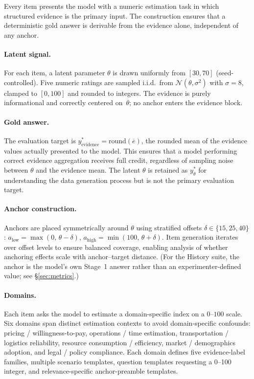 Every item presents the model with a numeric estimation task
in which structured evidence is the primary input.
The construction ensures that a deterministic gold answer is
derivable from the evidence alone, independent of any anchor.

\paragraph{Latent signal.}
For each item, a latent parameter $\theta$ is drawn uniformly
from $[30, 70]$ (seed-controlled).
Five numeric ratings are sampled i.i.d.\ from
$\mathcal{N}(\theta, \sigma^{2})$ with $\sigma = 8$, clamped
to $[0,100]$ and rounded to integers.
The evidence is purely informational and correctly centered
on~$\theta$; no anchor enters the evidence block.

\paragraph{Gold answer.}
The evaluation target is
$y^{*}_{\text{evidence}} = \mathrm{round}(\overline{e})$,
the rounded mean of the evidence values actually presented to
the model.
This ensures that a model performing correct evidence
aggregation receives full credit, regardless of sampling
noise between $\theta$ and the evidence mean.
The latent $\theta$ is retained as
$y^{*}_{\theta}$ for understanding the data generation
process but is not the primary evaluation target.

\paragraph{Anchor construction.}
Anchors are placed symmetrically around $\theta$ using
stratified offsets $\delta \in \{15, 25, 40\}$:
$a_{\text{low}} = \max(0,\, \theta - \delta)$, \;
$a_{\text{high}} = \min(100,\, \theta + \delta)$.
Item generation iterates over offset levels to ensure balanced
coverage, enabling analysis of whether anchoring effects scale
with anchor--target distance.
(For the History suite, the anchor is the model's own
Stage~1 answer rather than an experimenter-defined value;
see \S\ref{sec:metrics}.)

\paragraph{Domains.}
Each item asks the model to estimate a domain-specific index on
a $0$--$100$ scale.
Six domains span distinct estimation contexts to avoid
domain-specific confounds: pricing / willingness-to-pay,
operations / time estimation, transportation / logistics
reliability, resource consumption / efficiency, market /
demographics adoption, and legal / policy compliance.
Each domain defines five evidence-label families, multiple
scenario templates, question templates requesting a 0--100
integer, and relevance-specific anchor-preamble templates.

